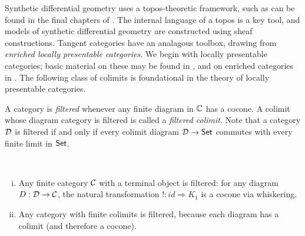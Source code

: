 

Synthetic differential geometry uses a topos-theoretic framework, such as can be found in the final chapters of \cite{Lavendhomme1996}.
The internal language of a topos is a key tool, and models of synthetic differential geometry are constructed using sheaf constructions.
Tangent categories have an analagous toolbox, drawing from \emph{enriched locally presentable categories}. We begin with locally presentable categories; basic material on these may be found in \cite{Adamek1994}, and on enriched categories in \cite{Kelly2005}.
The following class of colimits is foundational in the theory of locally presentable categories.
\begin{definition}\label{def:filtered-colimit}
	A category is \emph{filtered} whenever any finite diagram in $\mathbb{C}$ has a cocone. A colimit whose diagram category is filtered is called a \emph{filtered colimit}. Note that a category $\mathcal{D}$ is filtered if and only if every colimit diagram $\mathcal{D} \to \mathsf{Set}$ commutes with every finite limit in $\mathsf{Set}$.
\end{definition}
\begin{example}
    ~\begin{enumerate}[(i)]
        \item Any finite category $\mathcal{C}$ with a terminal object is filtered: for any diagram $D:\mathcal{D} \to \mathcal{C}$, the natural transformation $!:id \Rightarrow K_1$ is a cocone via whiskering.\[\]
        \item Any category with finite colimits is filtered, because each diagram has a colimit (and therefore a cocone). 
    \end{enumerate}
\end{example}
